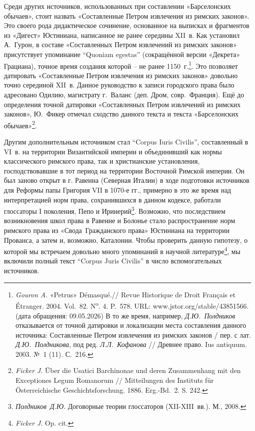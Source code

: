Среди других источников, использованных при составлении «Барселонских обычаев», стоит назвать «Составленные Петром извлечения из римских законов». Это своего рода дидактическое сочинение, основанное на выписках и фрагментов из «Дигест» Юстиниана, написанное не ранее середины XII~в. Как установил А.~Гурон, в составе «Составленных Петром извлечений из римских законов» присутствует упоминание “Quoniam egestas” (сокращённой версии «Декрета» Грациана), точное время создания которой -- не ранее 1150~г.\footnote{\emph{Gouron A. }«Petrus» Démasqué.// Revue Historique de Droit Français et Étranger. 2004. Vol.~82. N\textsuperscript{o}. 4. P.~578. URL: www.jstor.org/stable/43851566. (дата обращения: 09.05.2026) В то же время, например, \emph{Д.Ю.~Полдников} отказывается от точной датировки и локализации места составления данного источника: Составленные Петром извлечения из римских законов / пер. с лат. \emph{Д.Ю.~Полдникова}, под ред. \emph{Л.Л.~Кофанова} // Древнее право. Ius antiquum. 2003. №~1 (11). С.~216.}. Это позволяет датировать «Составленные Петром извлечения из римских законов» довольно точно серединой XII~в. Данное руководство к записи городского права было адресовано Одилию, магистрату г.~Валанс (деп. Дром, совр.~Франция). Ещё до определения точной датировки «Составленных Петром извлечений из римских законов», Ю.~Фикер отмечал сходство данного текста и текста «Барселонских обычаев»\footnote{\emph{Ficker J.} Über die Usatici Barchinonae und deren Zusammenhang mit den Exceptiones Legum Romanorum // Mitteilungen des Instituts für Österreichische Geschichtsforschung. 1886. Erg.-Bd.~2. S.\emph{ }242.}.

Другим дополнительным источником стал “Corpus Iuris Civilis”, составленный в VI~в. на территории Византийской империи и объединивший как нормы классического римского права, так и христианские установления, господствовавшие в тот период на территории Восточной Римской империи. Он был заново открыт в г. Равенна (Северная Италии) в ходе подготовки источников для Реформы папы Григория VII в 1070-е гг., примерно в это же время над интерпретацией норм права, сохранившихся в данном кодексе, работали глоссаторы I поколения, Пепо и Иринерий\footnote{\emph{Полдников~Д.Ю. }Договорные теории глоссаторов (XII-XIII~вв.). М., 2008.}. Возможно, что последствием возникновения школ права в Равенне и Болонье стало распространение норм римского права из «Свода~Гражданского права» Юстиниана на территории Прованса, а затем и, возможно, Каталонии. Чтобы проверить данную гипотезу, о которой мы встречаем довольно много упоминаний в научной литературе\footnote{\emph{Ficker J. }Op. cit.}, мы включили полный текст “Corpus Juris Civilis” в число вспомогательных источников.

